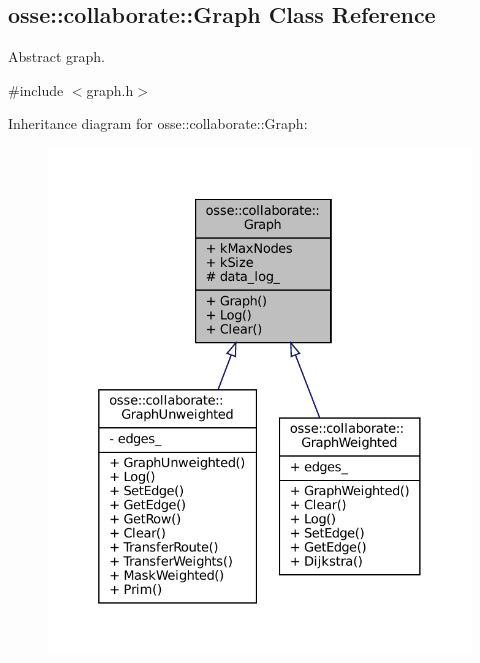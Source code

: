 \hypertarget{classosse_1_1collaborate_1_1_graph}{}\subsection{osse\+:\+:collaborate\+:\+:Graph Class Reference}
\label{classosse_1_1collaborate_1_1_graph}


Abstract graph.  




{\ttfamily \#include $<$graph.\+h$>$}



Inheritance diagram for osse\+:\+:collaborate\+:\+:Graph\+:
\nopagebreak
\begin{figure}[H]
\begin{center}
\leavevmode
\includegraphics[width=332pt]{classosse_1_1collaborate_1_1_graph__inherit__graph}
\end{center}
\end{figure}

